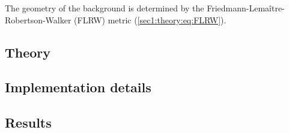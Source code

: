 

The geometry of the background is determined by the Friedmann-Lemaître-Robertson-Walker (FLRW) metric (\cref{sec1:theory:eq:FLRW}).


\subsection{Theory}


\subsection{Implementation details}


\subsection{Results}

